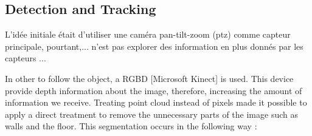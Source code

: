 \subsection{Detection and Tracking}

L'idée initiale était d'utiliser une caméra pan-tilt-zoom (ptz) comme
capteur principale, pourtant,... n'est pas explorer des information en
plus donnés par les capteurs ...

In other to follow the object, a RGBD [Microsoft Kinect] is used. This
device provide depth information about the image, therefore,
increasing the amount of information we receive. Treating point cloud
instead of pixels made it possible to apply a direct treatment to
remove the unnecessary parts of the image such as walls and the
floor. This segmentation occurs in the following way :





